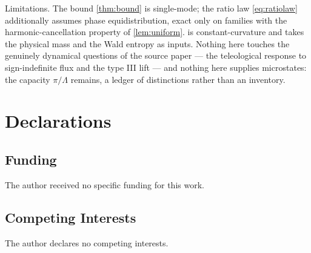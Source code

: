\documentclass[11pt,a4paper]{article}
\theoremstyle{plain}
\theoremstyle{definition}
\begin{document}
Limitations. The bound \cref{thm:bound} is single-mode; the ratio law
\cref{eq:ratiolaw} additionally assumes phase equidistribution, exact only
on families with the harmonic-cancellation property of \cref{lem:uniform}.
 is constant-curvature and takes the physical mass and the
Wald entropy as inputs. Nothing here touches the genuinely dynamical questions of the source paper
--- the teleological response to sign-indefinite flux and the type III lift
--- and nothing here supplies microstates: the capacity $\pi/\Lambda$
remains, a ledger of distinctions rather than an inventory.


\footnotesize

\section*{Declarations}

\subsection*{Funding}
The author received no specific funding for this work.

\subsection*{Competing Interests}
The author declares no competing interests.
\end{document}
